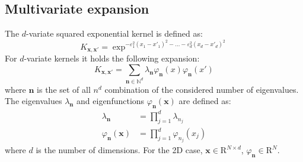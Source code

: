 \documentclass[10pt,a4paper,twocolumn]{article}
\begin{document}
\subsection{Multivariate expansion}
The $d$-variate squared exponential kernel is defined as:
\begin{equation}
	K_{\mathbf{x}, \mathbf{x'}} = \exp^{-\varepsilon_1^2\left(x_1 - x'_1\right)^2  - \ldots - \varepsilon_d^2\left(x_d - x'_d\right)^2}
\end{equation}
For $d$-variate kernels it holds the following expansion:
\begin{equation}
	K_{\mathbf{x},\mathbf{x'}} =  \sum_{\mathbf{n}\in \mathbb{N}^d} \lambda_{\mathbf{n}} \varphi_{\mathbf{n}}(x) \varphi_{\mathbf{n}}(x')
	\end{equation}
where $\mathbf{n}$ is the set of all $n^d$ combination of the considered number of eigenvalues.
The eigenvalues $\lambda_{\mathbf{n}}$ and eigenfunctions $\varphi_{\mathbf{n}}(\mathbf{x})$ are defined as:
\begin{align}
	\lambda_{\mathbf{n}} &= \prod_{j=1}^{d} \lambda_{n_j} \\
	\varphi_{\mathbf{n}}(\mathbf{x}) &= \prod_{j=1}^{d} \varphi_{n_{j}}(x_j)
\end{align}
where $d$ is the number of dimensions. For the 2D case, $\mathbf{x} \in \mathrm{R}^{N \times d}$, $ \varphi_{\mathbf{n}} \in \mathrm{R}^{N}$.
	
\end{document}
